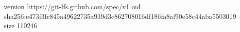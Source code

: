 version https://git-lfs.github.com/spec/v1
oid sha256:e473f3fc845a49622735a939d3e862708016df186fa8af90e58c44aba5503019
size 110246
